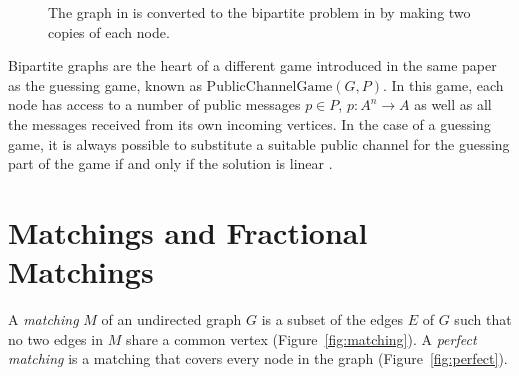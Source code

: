 \begin{figure}[ht]
     \centering
     \hspace{.3in}

		 \caption[Rearranging a graph into a bipartite flow problem]{The graph in  is converted to the bipartite problem in  by making two copies of each node.}
\end{figure}

Bipartite graphs are the heart of a different game introduced in the same paper as the guessing game, known as $\mathrm{PublicChannelGame}(G, P)$. In this game, each node has access to a number of public messages $p \in P$, $p : A^n \rightarrow A$ as well as all the messages received from its own incoming vertices. In the case of a guessing game, it is always possible to substitute a suitable public channel for the guessing part of the game if and only if the solution is linear \cite{riis2005util}.

\section{Matchings and Fractional Matchings}

A \emph{matching} $M$ of an undirected graph $G$ is a subset of the edges $E$ of $G$ such that no two edges in $M$ share a common vertex (Figure~\ref{fig:matching}). A \emph{perfect matching} is a matching that covers every node in the graph (Figure~\ref{fig:perfect}).

